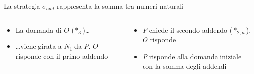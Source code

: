 \documentclass{beamer}
\begin{document}
\begin{frame}
	La strategia $\sigma_{add}$ rappresenta la somma tra numeri naturali
	\begin{columns}
		\begin{column}{0.45\textwidth}
			\begin{itemize}
				\item<2-> La domanda di $O$ ($*_3$)\dots
				\item<3-> \dots viene girata a $N_1$ da $P$. $O$ risponde con il primo addendo
	\end{itemize}
		\end{column}
		\begin{column}{0.45\textwidth}
			\begin{itemize}
				\item<5-> $P$ chiede il secondo addendo ($*_{2,n}$). $O$ risponde
				\item<7-> $P$ risponde alla domanda iniziale con la somma degli addendi
			\end{itemize}
		\end{column}
	\end{columns}	
	
	
	
\end{frame}
\end{document}
